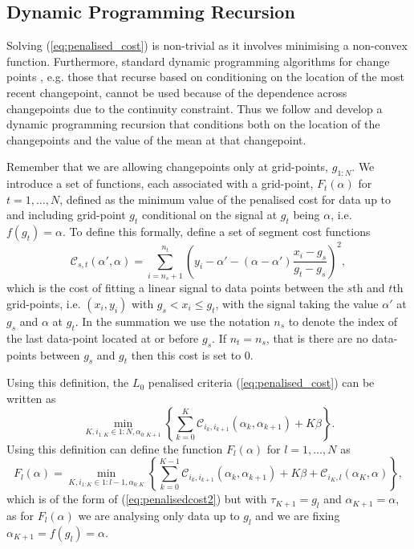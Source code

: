 \documentclass[nojss]{jss}
\begin{document}
\subsection{Dynamic Programming Recursion}

Solving (\ref{eq:penalised_cost}) is non-trivial as it involves minimising a non-convex function. Furthermore, standard dynamic programming algorithms for change points \citep{maidstone2017optimal}, e.g. those that recurse based on conditioning on the location of the most recent changepoint,  cannot be used because of the dependence across changepoints due to the continuity constraint. Thus we follow \cite{fearnhead2019detecting} and develop a dynamic programming recursion that conditions both on the location of the changepoints and the value of the mean at that changepoint.

Remember that we are allowing changepoints only at grid-points, $g_{1:N}$. We introduce a set of functions, each associated with a grid-point, $F_t(\alpha)$ for $t=1,\ldots,N$, defined as the minimum value of the penalised cost for data up to and including grid-point $g_t$ conditional on the signal at $g_t$ being $\alpha$, i.e. $f(g_t)=\alpha$. To define this formally, define a set of segment cost functions
\[
\mathcal{C}_{s,t}(\alpha',\alpha) = \sum_{i=n_s+1}^{n_t} \left(y_i -\alpha' - (\alpha-\alpha')\frac{x_i-g_s}{g_t-g_s} \right)^2,
\]
which is the cost of fitting a linear signal to data points between the $s$th and $t$th grid-points, i.e. $(x_i,y_i)$ with $g_s<x_i\leq g_t$, with the signal taking the value $\alpha'$ at $g_s$ and $\alpha$ at $g_t$. In the summation we use the notation $n_s$ to denote the index of the last data-point located at or before $g_s$. If $n_t=n_s$, that is there are no data-points between $g_s$ and $g_t$ then this cost is set to 0.

Using this definition, the $L_0$ penalised criteria (\ref{eq:penalised_cost}) can be written as
\begin{equation} \label{eq:penalisedcost2}
\min_{K,i_{1:K}\in {1:N}, \alpha_{0:K+1} }  \left\{
\sum_{k=0}^K \mathcal{C}_{i_k,i_{k+1}}(\alpha_k,\alpha_{k+1})
+K \beta
\right\}.
\end{equation}
Using this definition can define the function $F_l(\alpha)$ for $l=1,\ldots,N$ as
\[
F_l(\alpha)=
\min_{K,i_{1:K}\in {1:l-1}, \alpha_{0:K} } \left\{
\sum_{k=0}^{K-1} \mathcal{C}_{i_k,i_{k+1}}(\alpha_k,\alpha_{k+1})
+K\beta
+\mathcal{C}_{i_K,l}(\alpha_K,\alpha)
\right\},
\]
which is of the form of (\ref{eq:penalisedcost2}) but with $\tau_{K+1}=g_l$ and $\alpha_{K+1}=\alpha$, as for $F_l(\alpha)$ we are analysing only data up to $g_l$ and we are fixing $\alpha_{K+1}=f(g_l)=\alpha$.
\end{document}
